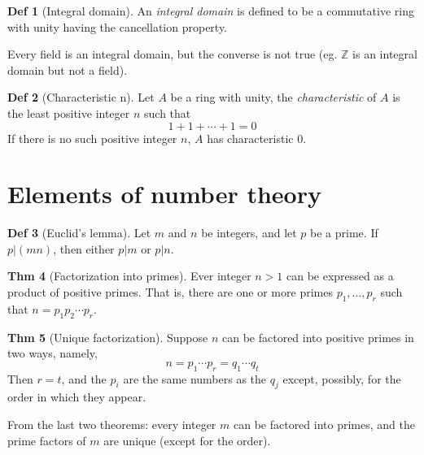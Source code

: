 \documentclass{article}
\theoremstyle{definition}
\newtheorem{definition}{Def}[section]
\newtheorem{theorem}[definition]{Thm}
\begin{document}
\begin{definition}[Integral domain]
    An \emph{integral domain} is defined to be a commutative ring with unity having the cancellation property.
\end{definition}

Every field is an integral domain, but the converse is not true (eg. $\mathbb{Z}$ is an integral domain but not a field).

\begin{definition}[Characteristic n]
    Let $A$ be a ring with unity, the \emph{characteristic} of $A$ is the least positive integer $n$ such that
    $$1 + 1 + \cdots + 1 = 0$$
    If there is no such positive integer $n$, $A$ has characteristic $0$.
\end{definition}

\section{Elements of number theory}

\begin{definition}[Euclid's lemma]
    Let $m$ and $n$ be integers, and let $p$ be a prime. If $p|(mn)$, then either $p|m$ or $p|n$.
\end{definition}

\begin{theorem}[Factorization into primes]
    Ever integer $n>1$ can be expressed as a product of positive primes. That is, there are one or more primes $p_1, \ldots, p_r$ such that $n=p_1 p_2 \cdots p_r$.
\end{theorem}

\begin{theorem}[Unique factorization]
    Suppose $n$ can be factored into positive primes in two ways, namely,
    $$n= p_1 \cdots p_r = q_1 \cdots q_t$$
    Then $r=t$, and the $p_i$ are the same numbers as the $q_j$ except, possibly, for the order in which they appear.
\end{theorem}

From the last two theorems: every integer $m$ can be factored into primes, and the prime factors of $m$ are unique (except for the order).
\end{document}
